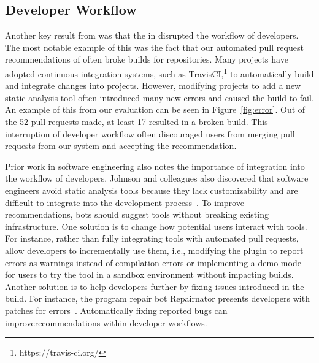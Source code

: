 \subsection{Developer Workflow}

Another key result from \sorry was that the \tele in \tool disrupted the workflow of developers. The most notable example of this was the fact that our automated pull request recommendations of \EP often broke builds for repositories. Many projects have adopted continuous integration systems, such as TravisCI,\footnote{https://travis-ci.org/} to automatically build and integrate changes into projects. However, modifying projects to add a new static analysis tool often introduced many new errors and caused the build to fail. An example of this from our evaluation can be seen in Figure~\ref{fig:error}. Out of the 52 pull requests made, at least 17 resulted in a broken build. This interruption of developer workflow often discouraged users from merging pull requests from our system and accepting the recommendation. 

Prior work in software engineering also notes the importance of integration into the workflow of developers. Johnson and colleagues also discovered that software engineers avoid static analysis tools because they lack customizability and are difficult to integrate into the development process~\cite{Johnson2013Why}. To improve  recommendations, bots  should  suggest  tools without breaking existing infrastructure.  One solution is to change how  potential  users  interact  with  tools.  For instance, rather than fully integrating tools with automated pull requests, allow developers to incrementally use them, i.e., modifying the \EP plugin to report errors as warnings instead of compilation errors or implementing a demo-mode for users to try  the tool in a sandbox environment without impacting builds. Another solution is to help developers further by fixing issues introduced  in  the  build. For instance, the program repair bot  Repairnator presents developers with patches for errors~\cite{Repairnator}. Automatically  fixing  reported  bugs  can  improverecommendations within developer workflows.


